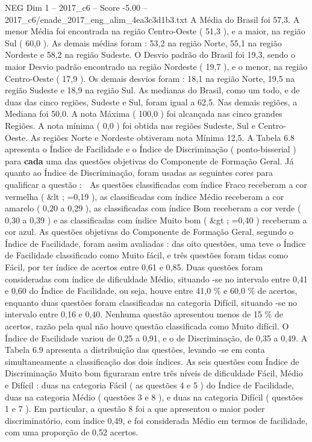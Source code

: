 \begin{textsample}{NEG Dim 1 – 2017\_c6 – Score -5.00 – 2017\_c6/enade\_2017\_eng\_alim\_4ea3c3d1b3.txt}
A Média do Brasil foi 57,3.
A menor Média foi encontrada na região Centro-Oeste ( 51,3 ), e a maior, na região Sul ( 60,0 ).
As demais médias foram : 53,2 na região Norte, 55,1 na região Nordeste e 58,2 na região Sudeste.
O Desvio padrão do Brasil foi 19,3, sendo o maior Desvio padrão encontrado na região Nordeste ( 19,7 ), e o menor, na região Centro-Oeste ( 17,9 ).
Os demais desvios foram : 18,1 na região Norte, 19,5 na região Sudeste e 18,9 na região Sul.
As medianas do Brasil, como um todo, e de duas das cinco regiões, Sudeste e Sul, foram igual a 62,5.
Nas demais regiões, a Mediana foi 50,0.
A nota Máxima ( 100,0 ) foi alcançada nas cinco grandes Regiões.
A nota mínima ( 0,0 ) foi obtida nas regiões Sudeste, Sul e Centro-Oeste.
As regiões Norte e Nordeste obtiveram nota Mínima 12,5.
A Tabela 6.8 apresenta o Índice de Facilidade e o Índice de Discriminação ( ponto-bisserial ) para \textbf{cada} uma das questões objetivas do Componente de Formação Geral.
Já quanto ao Índice de Discriminação, foram usadas as seguintes cores para qualificar a questão :  As questões classificadas com índice Fraco receberam a cor vermelha ( \&lt ; =0,19 ), as classificadas com índice Médio receberam a cor amarelo ( 0,20 a 0,29 ), as classificadas com índice Bom receberam a cor verde ( 0,30 a 0,39 ) e as classificadas com índice Muito bom ( \&gt ; =0,40 ) receberam a cor azul.
As questões objetivas do Componente de Formação Geral, segundo o Índice de Facilidade, foram assim avaliadas : das oito questões, uma teve o Índice de Facilidade classificado como Muito fácil, e três questões foram tidas como Fácil, por ter índice de acertos entre 0,61 e 0,85.
Duas questões foram consideradas com índice de dificuldade Médio, situando -se no intervalo entre 0,41 e 0,60 do Índice de Facilidade, ou seja, houve entre 41,0 \% e 60,0 \% de acertos, enquanto duas questões foram classificadas na categoria Difícil, situando -se no intervalo entre 0,16 e 0,40.
Nenhuma questão apresentou menos de 15 \% de acertos, razão pela qual não houve questão classificada como Muito difícil.
O Índice de Facilidade variou de 0,25 a 0,91, e o de Discriminação, de 0,35 a 0,49.
A Tabela 6.9 apresenta a distribuição das questões, levando -se em conta simultaneamente a classificação dos dois índices.
As seis questões com Índice de Discriminação Muito bom figuraram entre três níveis de dificuldade Fácil, Médio e Difícil : duas na categoria Fácil ( as questões 4 e 5 ) do Índice de Facilidade, duas na categoria Médio ( questões 3 e 8 ), e duas na categoria Difícil ( questões 1 e 7 ).
Em particular, a questão 8 foi a que apresentou o maior poder discriminatório, com índice 0,49, e foi considerada Médio em termos de facilidade, com uma proporção de 0,52 acertos.

\end{textsample}
